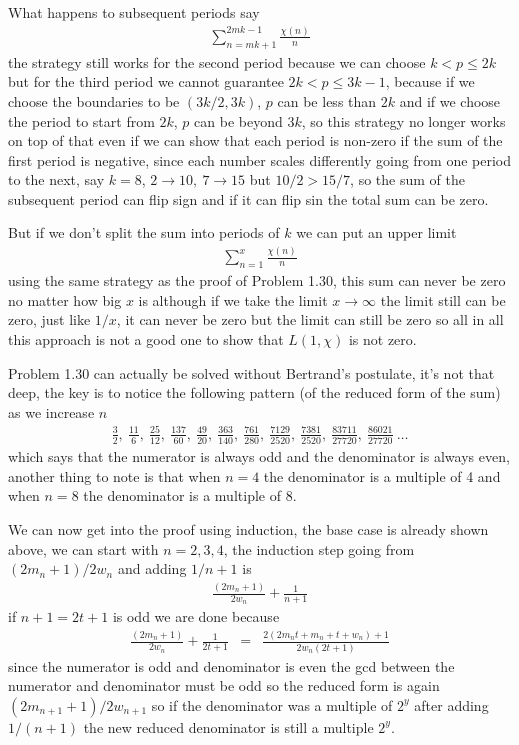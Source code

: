 \documentclass[aps,preprint,preprintnumbers,nofootinbib,showpacs,prd]{revtex4-1}
\newcommand{\nbea}{\begin{eqnarray*}}
\newcommand{\neea}{\end{eqnarray*}}
\begin{document}
What happens to subsequent periods say
%
\nbea
\sum_{n=mk+1}^{2mk-1} \frac{\chi(n)}{n}
\neea
%
the strategy still works for the second period because we can choose $k < p \le 2k$ but for the third period we cannot guarantee $2k < p \le 3k - 1$, because if we choose the boundaries to be $(3k/2, 3k)$, $p$ can be less than $2k$ and if we choose the period to start from $2k$, $p$ can be beyond $3k$, so this strategy no longer works on top of that even if we can show that each period is non-zero if the sum of the first period is negative, since each number scales differently going from one period to the next, say $k=8$, $2\to10,~7\to15$ but $10/2 > 15/7$, so the sum of the subsequent period can flip sign and if it can flip sin the total sum can be zero.

But if we don't split the sum into periods of $k$ we can put an upper limit
%
\nbea
\sum_{n=1}^{x} \frac{\chi(n)}{n}
\neea
%
using the same strategy as the proof of Problem 1.30, this sum can never be zero no matter how big $x$ is although if we take the limit $x\to\infty$ the limit still can be zero, just like $1/x$, it can never be zero but the limit can still be zero so all in all this approach is not a good one to show that $L(1,\chi)$ is not zero.

Problem 1.30 can actually be solved without Bertrand's postulate, it's not that deep, the key is to notice the following pattern (of the reduced form of the sum) as we increase $n$
%
\nbea
\frac{3}{2}, ~\frac{11}{6}, ~\frac{25}{12}, ~\frac{137}{60}, ~\frac{49}{20}, ~\frac{363}{140}, ~\frac{761}{280}, ~\frac{7129}{2520}, ~\frac{7381}{2520}, ~\frac{83711}{27720}, ~ \frac{86021}{27720}~\dots
\neea
%
which says that the numerator is always odd and the denominator is always even, another thing to note is that when $n=4$ the denominator is a multiple of 4 and when $n=8$ the denominator is a multiple of 8.

We can now get into the proof using induction, the base case is already shown above, we can start with $n=2,3,4$, the induction step going from $(2m_n + 1)/2w_n$ and adding $1/n+1$ is
%
\nbea
\frac{(2m_n + 1)}{2w_n} + \frac{1}{n+1}
\neea
%
if $n+1 = 2t+1$ is odd we are done because
%
\nbea
\frac{(2m_n + 1)}{2w_n} + \frac{1}{2t+1} & = & \frac{2(2m_n t  + m_n + t + w_n) + 1}{2w_n (2t+1)}
\neea
%
since the numerator is odd and denominator is even the gcd between the numerator and denominator must be odd so the reduced form is again $(2m_{n+1} + 1)/2w_{n+1}$ so if the denominator was a multiple of $2^y$ after adding $1/(n+1)$ the new reduced denominator is still a multiple $2^y$.
\end{document}
